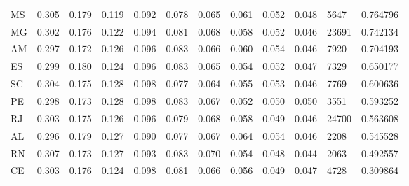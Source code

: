 \begin{tabular}{lrrrrrrrrrlr}
   MS &  0.305 &  0.179 &  0.119 &  0.092 &  0.078 &  0.065 &  0.061 &  0.052 &  0.048 &   5647 &  0.764796 \\
   MG &  0.302 &  0.176 &  0.122 &  0.094 &  0.081 &  0.068 &  0.058 &  0.052 &  0.046 &  23691 &  0.742134 \\
   AM &  0.297 &  0.172 &  0.126 &  0.096 &  0.083 &  0.066 &  0.060 &  0.054 &  0.046 &   7920 &  0.704193 \\
   ES &  0.299 &  0.180 &  0.124 &  0.096 &  0.083 &  0.065 &  0.054 &  0.052 &  0.047 &   7329 &  0.650177 \\
   SC &  0.304 &  0.175 &  0.128 &  0.098 &  0.077 &  0.064 &  0.055 &  0.053 &  0.046 &   7769 &  0.600636 \\
   PE &  0.298 &  0.173 &  0.128 &  0.098 &  0.083 &  0.067 &  0.052 &  0.050 &  0.050 &   3551 &  0.593252 \\
   RJ &  0.303 &  0.175 &  0.126 &  0.096 &  0.079 &  0.068 &  0.058 &  0.049 &  0.046 &  24700 &  0.563608 \\
   AL &  0.296 &  0.179 &  0.127 &  0.090 &  0.077 &  0.067 &  0.064 &  0.054 &  0.046 &   2208 &  0.545528 \\
   RN &  0.307 &  0.173 &  0.127 &  0.093 &  0.083 &  0.070 &  0.054 &  0.048 &  0.044 &   2063 &  0.492557 \\
   CE &  0.303 &  0.176 &  0.124 &  0.098 &  0.081 &  0.066 &  0.056 &  0.049 &  0.047 &   4728 &  0.309864 \\
\bottomrule
\end{tabular}
